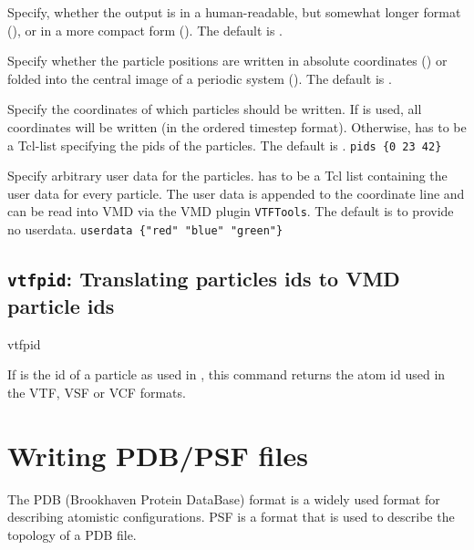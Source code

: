 \begin{arguments}
\item[\opt{\alt{short \asep verbose}}] Specify, whether the output is
  in a human-readable, but somewhat longer format (),
  or in a more compact form (). The default is
  .
  
\item[\opt{\alt{folded \asep absolute}}] Specify whether the particle
  positions are written in absolute coordinates ()
  or folded into the central image of a periodic system
  (). The default is .
  
\item[\opt{pids \alt{\var{pids} \asep all}}] Specify the coordinates
  of which particles should be written. If  is used, all
  coordinates will be written (in the ordered timestep format).
  Otherwise,  has to be a Tcl-list specifying the pids of
  the particles. The default is .
   \verb!pids {0 23 42}!

\item[\opt{userdata \var{userdata}}] Specify arbitrary user data for
  the particles.  has to be a Tcl list containing the
  user data for every particle. The user data is appended to the
  coordinate line and can be read into VMD via the VMD plugin
  \texttt{VTFTools}. The default is to provide no userdata.
   \verb!userdata {"red" "blue" "green"}!
\end{arguments}

\subsection{\texttt{vtfpid}: Translating \es particles ids to VMD
  particle ids}
\begin{essyntax}
  vtfpid 
\end{essyntax}
If  is the id of a particle as used in \es, this command
returns the atom id used in the VTF, VSF or VCF formats.

\section{Writing PDB/PSF files}
The PDB (Brookhaven Protein DataBase) format is a widely used format
for describing atomistic configurations. PSF is a format that is used
to describe the topology of a PDB file. 

